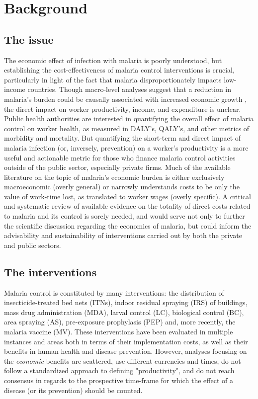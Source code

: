 \documentclass{article}
\begin{document}
\vfill  


\section*{Background}

\subsection*{The issue}


The economic effect of infection with malaria is poorly understood, but establishing the cost-effectiveness of malaria control interventions is crucial, particularly in light of the fact that malaria disproportionately impacts low-income countries. Though macro-level analyses suggest that a reduction in malaria's burden could be causally associated with increased economic growth \cite{Sachs2002}, the direct impact on worker productivity, income, and expenditure is unclear. \\


\noindent Public health authorities are interested in quantifying the overall effect of malaria control on worker health, as measured in DALY's, QALY's, and other metrics of morbidity and mortality. But quantifying the short-term and direct impact of malaria infection (or, inversely, prevention) on a worker's productivity is a more useful and actionable metric for those who finance malaria control activities outside of the public sector, especially private firms. Much of the available literature on the topic of malaria's economic burden is either exclusively macroeconomic (overly general) \cite{Bloom2004} or narrowly understands costs to be only the value of work-time lost, as translated to worker wages (overly specific)\cite{Chima2003}. A critical and systematic review of available evidence on the totality of direct costs related to malaria and its control is sorely needed, and would serve not only to further the scientific discussion regarding the economics of malaria, but could inform the advisability and sustainability of interventions carried out by both the private and public sectors. 

\subsection*{The interventions}

Malaria control is constituted by many interventions: the distribution of insecticide-treated bed nets (ITNs), indoor residual spraying (IRS) of buildings, mass drug administration (MDA), larval control (LC), biological control (BC), area spraying (AS), pre-exposure prophylasis (PEP) and, more recently, the malaria vaccine (MV). These interventions have been evaluated in multiple instances and areas both in terms of their implementation costs, as well as their benefits in human health and disease prevention. However, analyses focusing on the \emph{economic} benefits are scattered, use different currencies and times, do not follow a standardized approach to defining "productivity", and do not reach consensus in regards to the prospective time-frame for which the effect of a disease (or its prevention) should be counted.\\  
\end{document}
